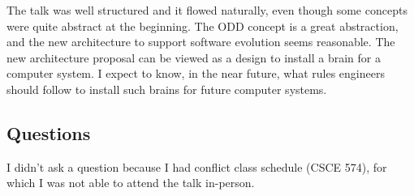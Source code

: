 \documentclass[11pt, oneside]{article}   	%
\begin{document}
The talk was well structured and it flowed naturally, even though some concepts were quite abstract at the beginning. The ODD concept is a great abstraction, and the new architecture to support software evolution seems reasonable. The new architecture proposal can be viewed as a design to install a brain for a computer system. I expect to know, in the near future, what rules engineers should follow to install such brains for future computer systems.

\subsection{Questions}
I didn't ask a question because I had conflict class schedule (CSCE 574), for which I was not able to attend the talk in-person.
\end{document}
